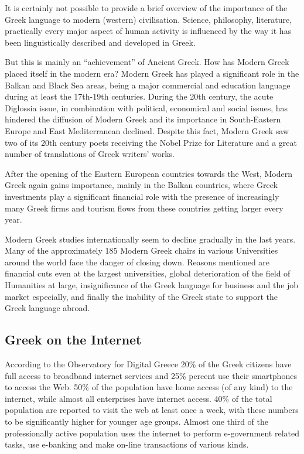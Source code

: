 \documentclass[]{../../metanetpaper}
\begin{document}
\begin{multicols}{2}
It is certainly not possible to provide a brief overview of the importance of the Greek language to modern (western) civilisation. Science, philosophy, literature, practically every major aspect of human activity is influenced by the way it has been linguistically described and developed in Greek.

But this is mainly an “achievement” of Ancient Greek. How has Modern Greek placed itself in the modern era? Modern Greek has played a significant role in the Balkan and Black Sea areas, being a major commercial and education language during at least the 17th-19th centuries. During the 20th century, the acute Diglossia issue, in combination with political, economical and social issues, has hindered the diffusion of Modern Greek and its importance in South-Eastern Europe and East Mediterranean declined. Despite this fact, Modern Greek saw two of its 20th century poets receiving the Nobel Prize for Literature and a great number of translations of Greek writers’ works.

After the opening of the Eastern European countries towards the West, Modern Greek again gains importance, mainly in the Balkan countries, where Greek investments play a significant financial role with the presence of increasingly many Greek firms and tourism flows from these countries getting larger every year. 

Modern Greek studies internationally seem to decline gradually in the last years. Many of the approximately 185 Modern Greek chairs in various Universities around the world face the danger of closing down. Reasons mentioned are financial cuts even at the largest universities, global deterioration of the field of Humanities at large, insignificance of the Greek language for business and the job market especially, and finally the inability of the Greek state to support the Greek language abroad.

\subsection{Greek on the Internet}

According to the Observatory for Digital Greece \cite{Obs1} 20\% of the Greek citizens have full access to broadband internet services and 25\% percent use their smartphones to access the Web. 50\% of the population have home access (of any kind) to the internet, while almost all enterprises have internet access. 40\% of the total population are reported to visit the web at least once a week, with these numbers to be significantly higher for younger age groups. Almost one third of the professionally active population uses the internet to perform e-government related tasks, use e-banking and make on-line transactions of various kinds.


\end{multicols}
\end{document}

